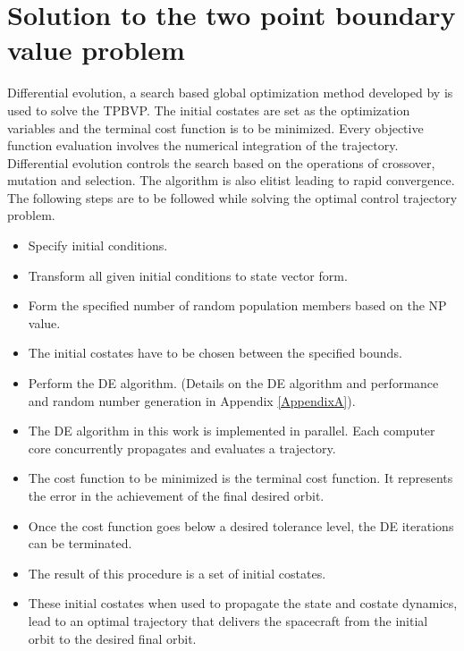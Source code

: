 \section{Solution to the two point boundary value problem}
Differential evolution, a search based global optimization method developed by \cite{storn_differential_1997} is used to solve the TPBVP. The initial costates are set as the optimization variables and the terminal cost function is to be minimized. Every objective function evaluation involves the numerical integration of the trajectory. Differential evolution controls the search based on the operations of crossover, mutation and selection. The algorithm is also elitist leading to rapid convergence. The following steps are to be followed while solving the optimal control trajectory problem.
\begin{itemize}
	\item Specify initial conditions.
	\item Transform all given initial conditions to state vector form. 
	\item Form the specified number of random population members based on the NP value.
	\item The initial costates have to be chosen between the specified bounds.
	\item Perform the DE algorithm. (Details on the DE algorithm and performance and random number generation in Appendix \ref{AppendixA}).
	\item The DE algorithm in this work is implemented in parallel. Each computer core concurrently propagates and evaluates a trajectory.
	\item The cost function to be minimized is the terminal cost function. It represents the error in the achievement of the final desired orbit.
	\item Once the cost function goes below a desired tolerance level, the DE iterations can be terminated.
	\item The result of this procedure is a set of initial costates.
	\item These initial costates when used to propagate the state and costate dynamics, lead to an optimal trajectory that delivers the spacecraft from the initial orbit to the desired final orbit.
\end{itemize}

